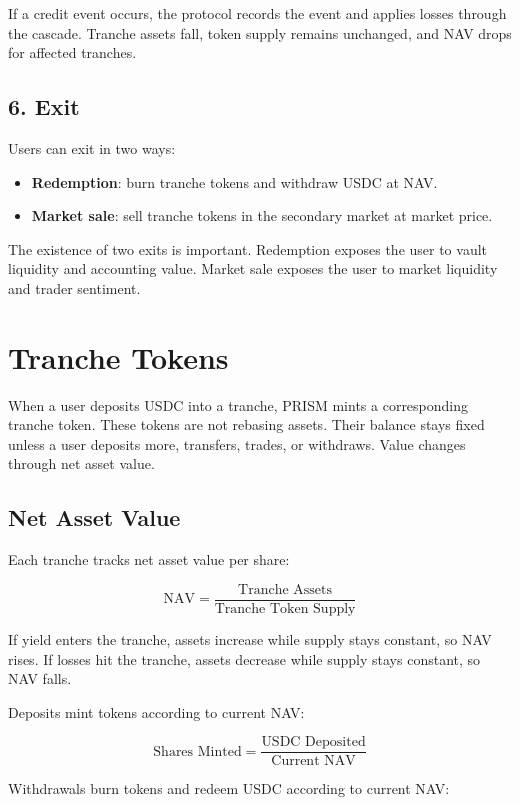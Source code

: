 \documentclass[11pt]{article}
\begin{document}
If a credit event occurs, the protocol records the event and applies losses
through the cascade. Tranche assets fall, token supply remains unchanged, and NAV
drops for affected tranches.

\subsection{6. Exit}

Users can exit in two ways:

\begin{itemize}
  \item \textbf{Redemption}: burn tranche tokens and withdraw USDC at NAV.
  \item \textbf{Market sale}: sell tranche tokens in the secondary market at
  market price.
\end{itemize}

The existence of two exits is important. Redemption exposes the user to vault
liquidity and accounting value. Market sale exposes the user to market liquidity
and trader sentiment.

\section{Tranche Tokens}

When a user deposits USDC into a tranche, PRISM mints a corresponding tranche
token. These tokens are not rebasing assets. Their balance stays fixed unless a
user deposits more, transfers, trades, or withdraws. Value changes through net
asset value.

\subsection{Net Asset Value}

Each tranche tracks net asset value per share:

\[
\text{NAV} = \frac{\text{Tranche Assets}}{\text{Tranche Token Supply}}
\]

If yield enters the tranche, assets increase while supply stays constant, so NAV
rises. If losses hit the tranche, assets decrease while supply stays constant, so
NAV falls.

Deposits mint tokens according to current NAV:

\[
\text{Shares Minted} = \frac{\text{USDC Deposited}}{\text{Current NAV}}
\]

Withdrawals burn tokens and redeem USDC according to current NAV:
\end{document}
